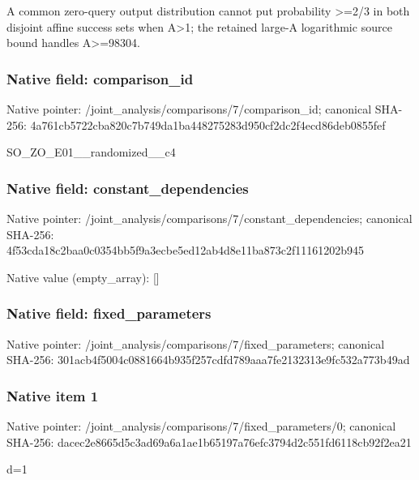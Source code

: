 \documentclass[10pt,a4paper]{article}
\begin{document}
\begingroup\raggedright\sloppy A common zero-query output distribution cannot put probability >=\allowbreak{}2/\allowbreak{}3 in both disjoint affine success sets when A>1;\allowbreak{} the retained large-A logarithmic source bound handles A>=\allowbreak{}98304.\par\endgroup

\subsubsection{Native field: comparison\_\allowbreak{}id}
Native pointer: /joint\_\allowbreak{}analysis/comparisons/7/comparison\_\allowbreak{}id; canonical SHA-256: 4a761cb5722cba820c7b749da1ba448275283d950cf2dc2f4ecd86deb0855fef

\begingroup\raggedright\sloppy SO\_\allowbreak{}ZO\_\allowbreak{}E01\_\allowbreak{}\_\allowbreak{}randomized\_\allowbreak{}\_\allowbreak{}c4\par\endgroup

\subsubsection{Native field: constant\_\allowbreak{}dependencies}
Native pointer: /joint\_\allowbreak{}analysis/comparisons/7/constant\_\allowbreak{}dependencies; canonical SHA-256: 4f53cda18c2baa0c0354bb5f9a3ecbe5ed12ab4d8e11ba873c2f11161202b945

Native value (empty\_\allowbreak{}array): []

\subsubsection{Native field: fixed\_\allowbreak{}parameters}
Native pointer: /joint\_\allowbreak{}analysis/comparisons/7/fixed\_\allowbreak{}parameters; canonical SHA-256: 301acb4f5004c0881664b935f257cdfd789aaa7fe2132313e9fc532a773b49ad

\subsubsection{Native item 1}
Native pointer: /joint\_\allowbreak{}analysis/comparisons/7/fixed\_\allowbreak{}parameters/0; canonical SHA-256: dacec2e8665d5c3ad69a6a1ae1b65197a76efc3794d2c551fd6118cb92f2ea21

\begingroup\raggedright\sloppy d=\allowbreak{}1\par\endgroup
\end{document}
